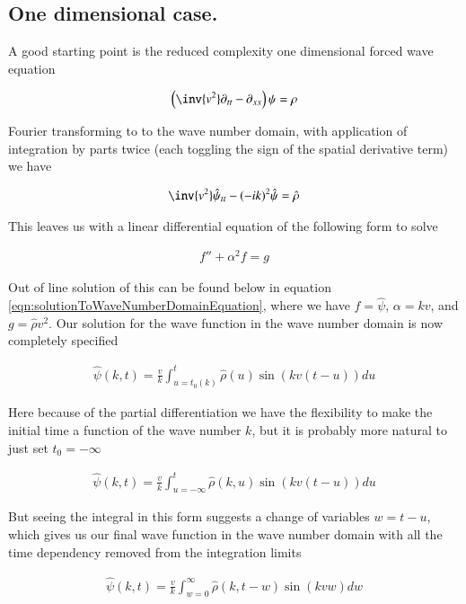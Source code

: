 \documentclass{article}
\begin{document}
\subsection{ One dimensional case. }

A good starting point is the reduced complexity one dimensional forced
wave equation

\begin{align}
\left( \inv{v^2} \partial_{tt} -\partial_{xx} \right)\psi = \rho
\end{align}

Fourier transforming to to the wave number domain, with application of integration by parts twice (each toggling the sign of the spatial
derivative term) we have

\begin{align}
\inv{v^2}\hat{\psi}_{tt} - (-i k)^2 \hat{\psi} = \hat{\rho}
\end{align}

This leaves us with a linear differential equation of the following form to solve

\begin{align}\label{eqn:waveNumEquationToSolve}
f'' + \alpha^2 f = g
\end{align}

Out of line solution of this can be found below in equation \ref{eqn:solutionToWaveNumberDomainEquation}, where we have
$f = \hat{\psi}$, $\alpha = k v$, and $g = \hat{\rho} v^2$.  Our solution for the wave function in the wave number domain is now completely
specified

\begin{align*}
\hat{\psi}(k, t) = \frac{v}{k} \int_{u=t_0(k)}^t \hat{\rho}(u) \sin( k v (t-u) ) du
\end{align*}

Here because of the partial differentiation we have the flexibility to make the initial time a function of the wave number $k$, but it is probably
more natural to just set $t_0 = -\infty$

\begin{align*}
\hat{\psi}(k, t) = \frac{v}{k} \int_{u = -\infty}^t \hat{\rho}(k, u) \sin( k v (t-u) ) du
\end{align*}

But seeing the integral in this form suggests a change of variables $w = t-u$, which gives us our final wave function in the wave number domain with all the time
dependency removed from the integration limits

\begin{align*}
\hat{\psi}(k, t) = \frac{v}{k} \int_{w = 0}^\infty \hat{\rho}(k, t-w) \sin( k v w ) dw
\end{align*}
\end{document}
